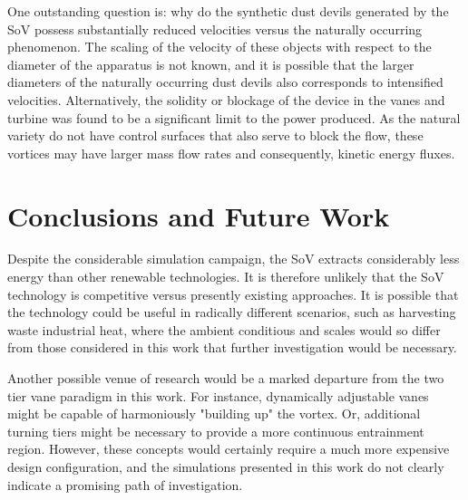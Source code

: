 



One outstanding question is: why do the synthetic dust devils generated by
the SoV possess substantially reduced velocities versus the naturally
occurring phenomenon. The scaling of the velocity of these objects with
respect to the diameter of the apparatus is not known, and it is
possible that the larger diameters of the naturally occurring dust
devils also corresponds to intensified velocities. Alternatively,
the solidity or blockage of the device in the vanes and turbine was
found to be a significant limit to the power produced. As the natural
variety do not have control surfaces that also serve to block the flow,
these vortices may have larger mass flow rates and consequently, 
kinetic energy fluxes.  
 
\section{Conclusions and Future Work}

Despite the considerable simulation campaign, the SoV extracts considerably less energy 
than other renewable technologies. It is therefore unlikely that the SoV 
technology is competitive versus presently existing approaches. 
It is possible that the technology could be useful in radically different scenarios, 
such as harvesting waste industrial heat, where the ambient conditious and scales 
would so differ from those considered in this work that further investigation 
would be necessary. 

Another possible venue of research would be a marked departure from the two tier 
vane paradigm in this work. For instance, dynamically adjustable vanes might be capable of 
harmoniously "building up" the vortex. Or, additional turning tiers might be necessary to 
provide a more continuous entrainment region. %
However, these concepts would certainly require a much more expensive design configuration, 
and the simulations presented in this work do not clearly indicate a promising 
path of investigation. 

